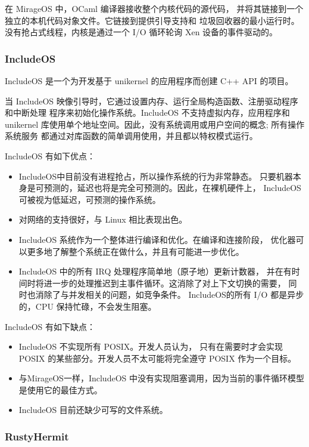 \documentclass{../runikraft-report}
\begin{document}
在 MirageOS 中，OCaml 编译器接收整个内核代码的源代码，
并将其链接到一个独立的本机代码对象文件。它链接到提供引导支持和
垃圾回收器的最小运行时。没有抢占式线程，内核是通过一个 I/O 循环轮询
Xen 设备的事件驱动的。\cite{bib:11-unikerel2}

\subsubsection{IncludeOS}

IncludeOS 是一个为开发基于 unikernel 的应用程序而创建 C++ API 的项目。\cite{bib:9-includeos}

当 IncludeOS 映像引导时，它通过设置内存、运行全局构造函数、注册驱动程序和中断处理
程序来初始化操作系统。IncludeOS 不支持虚拟内存，应用程序和
unikernel 库使用单个地址空间。因此，没有系统调用或用户空间的概念; 所有操作系统服务
都通过对库函数的简单调用使用，并且都以特权模式运行。\cite{bib:10-includeos2}

\noindent IncludeOS 有如下优点：\cite{bib:9-includeos}
\begin{itemize}
\item IncludeOS中目前没有进程抢占，所以操作系统的行为非常静态。
只要机器本身是可预测的，延迟也将是完全可预测的。因此，在裸机硬件上，
IncludeOS可被视为低延迟，可预测的操作系统。
\item 对网络的支持很好，与 Linux 相比表现出色。
\item IncludeOS 系统作为一个整体进行编译和优化。在编译和连接阶段，
优化器可以更多地了解整个系统正在做什么，并且有可能进一步优化。
\item IncludeOS 中的所有 IRQ 处理程序简单地（原子地）更新计数器，
并在有时间时将进一步的处理推迟到主事件循环。这消除了对上下文切换的需要，
同时也消除了与并发相关的问题，如竞争条件。
IncludeOS的所有 I/O 都是异步的，CPU 保持忙碌，不会发生阻塞。
\end{itemize}

\noindent IncludeOS 有如下缺点：\cite{bib:9-includeos}
\begin{itemize}
\item IncludeOS 不实现所有 POSIX。开发人员认为，
只有在需要时才会实现 POSIX 的某些部分。开发人员不太可能将完全遵守 POSIX 作为一个目标。
\item 与MirageOS一样，IncludeOS 中没有实现阻塞调用，因为当前的事件循环模型是使用它的最佳方式。
\item IncludeOS 目前还缺少可写的文件系统。
\end{itemize}

\subsubsection{RustyHermit}
\end{document}
